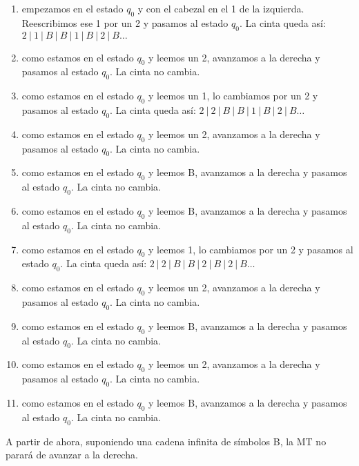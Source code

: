 \begin{problem}
\begin{enumerate}
	\item empezamos en el estado $q_0$ y con el cabezal en el 1 de la izquierda. Reescribimos ese 1 por un 2 y pasamos al estado $q_0$. La cinta queda así: $2 \ |\ 1  \ |\ B \ |\ B \ |\ 1 \ |\  B  \ |\ 2  \ |\ B \dots$
	\item como estamos en el estado $q_0$ y leemos un 2, avanzamos a la derecha y pasamos al estado $q_0$. La cinta no cambia.
	\item como estamos en el estado $q_0$ y leemos un 1, lo cambiamos por un 2 y pasamos al estado $q_0$. La cinta queda así: $2 \ |\ 2 \ |\ B \ |\ B \ |\ 1 \ |\  B  \ |\ 2  \ |\ B \dots$
	\item como estamos en el estado $q_0$ y leemos un 2, avanzamos a la derecha y pasamos al estado $q_0$. La cinta no cambia.
	\item como estamos en el estado $q_0$ y leemos B, avanzamos a la derecha y pasamos al estado $q_0$. La cinta no cambia.
	\item como estamos en el estado $q_0$ y leemos B, avanzamos a la derecha y pasamos al estado $q_0$. La cinta no cambia.
	\item como estamos en el estado $q_0$ y leemos 1, lo cambiamos por un 2 y pasamos al estado $q_0$. La cinta queda así: $2 \ |\ 2 \ |\ B \ |\ B \ |\ 2 \ |\  B  \ |\ 2  \ |\ B \dots$
	\item como estamos en el estado $q_0$ y leemos un 2, avanzamos a la derecha y pasamos al estado $q_0$. La cinta no cambia.
	\item como estamos en el estado $q_0$ y leemos B, avanzamos a la derecha y pasamos al estado $q_0$. La cinta no cambia.
	\item como estamos en el estado $q_0$ y leemos un 2, avanzamos a la derecha y pasamos al estado $q_0$. La cinta no cambia.
	\item como estamos en el estado $q_0$ y leemos B, avanzamos a la derecha y pasamos al estado $q_0$. La cinta no cambia.
\end{enumerate}

A partir de ahora, suponiendo una cadena infinita de símbolos B, la MT no parará de avanzar a la derecha.

\end{problem}


